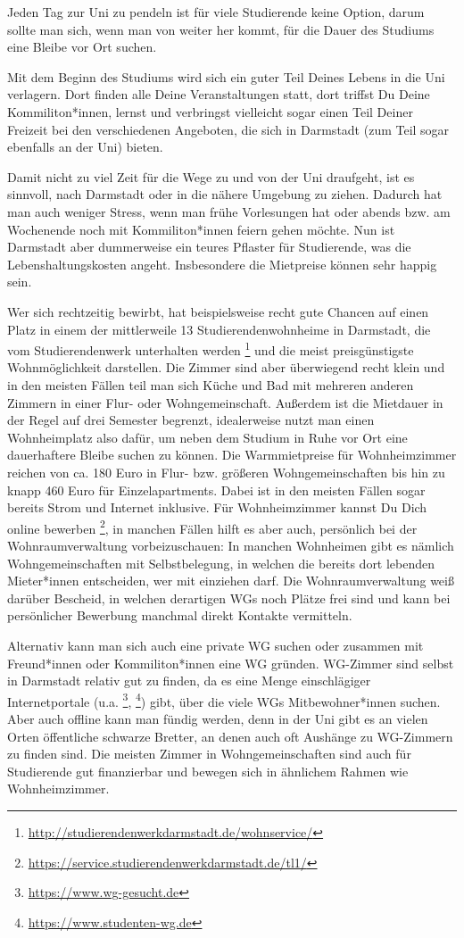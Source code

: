 {Jeden Tag zur Uni zu pendeln ist für viele Studierende keine Option, darum sollte man sich, wenn man von weiter her kommt, für die Dauer des Studiums eine Bleibe vor Ort suchen.
}
{Mit dem Beginn des Studiums wird sich ein guter Teil Deines Lebens in die Uni verlagern. Dort finden alle Deine Veranstaltungen statt, dort triffst Du Deine Kommiliton*innen, lernst und verbringst vielleicht sogar einen Teil Deiner Freizeit bei den verschiedenen Angeboten, die sich in Darmstadt (zum Teil sogar ebenfalls an der Uni) bieten.

    Damit nicht zu viel Zeit für die Wege zu und von der Uni draufgeht, ist es sinnvoll, nach Darmstadt oder in die nähere Umgebung zu ziehen. Dadurch hat man auch weniger Stress, wenn man frühe Vorlesungen hat oder abends bzw. am Wochenende noch mit Kommiliton*innen feiern gehen möchte. Nun ist Darmstadt aber dummerweise ein teures Pflaster für Studierende, was die Lebenshaltungskosten angeht. Insbesondere die Mietpreise können sehr happig sein.

    Wer sich rechtzeitig bewirbt, hat beispielsweise recht gute Chancen auf einen Platz in einem der mittlerweile 13 Studierendenwohnheime in Darmstadt, die vom Studierendenwerk unterhalten werden \footnote{\url{http://studierendenwerkdarmstadt.de/wohnservice/}} und die meist preisgünstigste Wohnmöglichkeit darstellen. Die Zimmer sind aber überwiegend recht klein und in den meisten Fällen teil man sich Küche und Bad mit mehreren anderen Zimmern in einer Flur- oder Wohngemeinschaft. Außerdem ist die Mietdauer in der Regel auf drei Semester begrenzt, idealerweise nutzt man einen Wohnheimplatz also dafür, um neben dem Studium in Ruhe vor Ort eine dauerhaftere Bleibe suchen zu können. Die Warmmietpreise für Wohnheimzimmer reichen von ca. 180 Euro in Flur- bzw. größeren Wohngemeinschaften bis hin zu knapp 460 Euro für Einzelapartments. Dabei ist in den meisten Fällen sogar bereits Strom und Internet inklusive. Für Wohnheimzimmer kannst Du Dich online bewerben \footnote{\url{https://service.studierendenwerkdarmstadt.de/tl1/}}, in manchen Fällen hilft es aber auch, persönlich bei der Wohnraumverwaltung vorbeizuschauen: In manchen Wohnheimen gibt es nämlich Wohngemeinschaften mit Selbstbelegung, in welchen die bereits dort lebenden Mieter*innen entscheiden, wer mit einziehen darf. Die Wohnraumverwaltung weiß darüber Bescheid, in welchen derartigen WGs noch Plätze frei sind und kann bei persönlicher Bewerbung manchmal direkt Kontakte vermitteln.

    Alternativ kann man sich auch eine private WG suchen oder zusammen mit Freund*innen oder Kommiliton*innen eine WG gründen. WG-Zimmer sind selbst in Darmstadt relativ gut zu finden, da es eine Menge einschlägiger Internetportale (u.a. \footnote{\url{https://www.wg-gesucht.de}}, \footnote{\url{https://www.studenten-wg.de}}) gibt, über die viele WGs Mitbewohner*innen suchen. Aber auch offline kann man fündig werden, denn in der Uni gibt es an vielen Orten öffentliche schwarze Bretter, an denen auch oft Aushänge zu WG-Zimmern zu finden sind. Die meisten Zimmer in Wohngemeinschaften sind auch für Studierende gut finanzierbar und bewegen sich in ähnlichem Rahmen wie Wohnheimzimmer.

}
